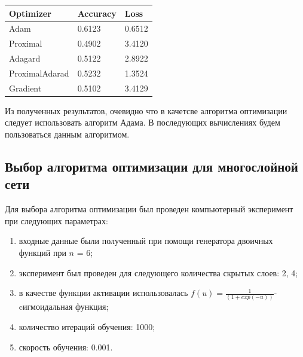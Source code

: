 \documentclass[a4paper,12pt,twoside]{article}
\begin{document}
	\begin{table}[ht!]
		\begin{tabular}{lll}
			\hline
			\multicolumn{1}{|l|}{\textbf{Optimizer}} & \multicolumn{1}{l|}{\textbf{Accuracy}} & \multicolumn{1}{l|}{\textbf{Loss}} \\ \hline
			Adam                                     & 0.6123                                 & 0.6512                             \\
			Proximal                                 & 0.4902                                 & 3.4120                             \\
			Adagard                                  & 0.5122                                 & 2.8922                             \\
			ProximalAdarad                           & 0.5232                                 & 1.3524                             \\
			Gradient                                 & 0.5102                                 & 3.4129                            
		\end{tabular}
	\end{table}
	
	\noindent Из полученных результатов, очевидно что в качетсве алгоритма оптимизации следует использовать алгоритм Адама. В последующих вычислениях будем пользоваться данным алгоритмом.
	
	\subsection{Выбор алгоритма оптимизации для многослойной сети}
	Для выбора алгоритма оптимизации был проведен компьютерный эксперимент при следующих параметрах:
	\begin{enumerate}
		\item входные данные были полученный при помощи генератора двоичных функций при $n$ = 6;
		\item эксперимент был проведен для следующего количества скрытых слоев: 2, 4;
		\item в качестве функции активации использовалась $f(u) = \frac{1}{(1 + exp(-u))}$- cигмоидальная функция;
		\item количество итераций обучения: 1000;
		\item скорость обучения: 0.001.
	\end{enumerate}
	
\end{document}
